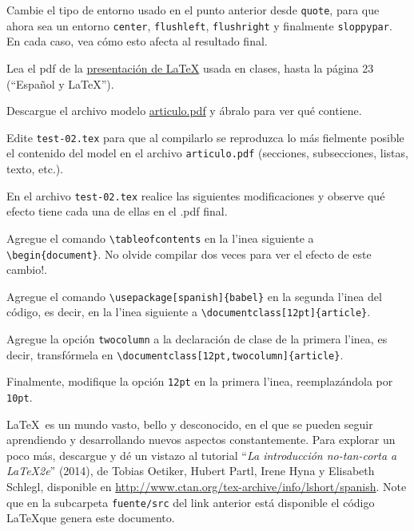\documentclass[11pt]{exam}
\begin{document}
\begin{questions}
\item Cambie el tipo de entorno usado en el punto anterior desde \texttt{quote}, para que ahora sea un entorno \texttt{center}, \texttt{flushleft}, \texttt{flushright} y finalmente \texttt{sloppypar}. En cada caso, vea cómo esto afecta al resultado final.

\item Lea el pdf de la \href{https://github.com/gfrubi/CC/blob/master/LaTeX/clases-LaTeX.pdf}{presentación de \LaTeX} usada en clases, hasta la página 23 (``Espa\~nol y \LaTeX'').

\item Descargue el archivo modelo \href{https://github.com/gfrubi/CC/blob/master/guias/03/articulo.pdf}{articulo.pdf} y ábralo para ver qué contiene. 


\item Edite \texttt{test-02.tex} para que al compilarlo se reproduzca lo más fielmente posible el contenido del model en el archivo \texttt{articulo.pdf} (secciones, subsecciones, listas, texto, etc.).

\item En el archivo \texttt{test-02.tex} realice las siguientes modificaciones y observe qué efecto tiene cada una de ellas en el .pdf final.
\begin{parts}
\item Agregue el comando \verb|\tableofcontents| en la l'inea siguiente a \verb|\begin{document}|. No olvide compilar dos veces para ver el efecto de este cambio!.
\item Agregue el comando \verb|\usepackage[spanish]{babel}| en la segunda l'inea del código, es decir, en la l'inea siguiente a \verb|\documentclass[12pt]{article}|.
\item Agregue la opción \verb|twocolumn| a la declaración de clase de la primera l'inea, es decir, transfórmela en \verb|\documentclass[12pt,twocolumn]{article}|.
\item Finalmente, modifique la opción \verb|12pt| en la primera l'inea, reemplazándola por \verb|10pt|.
\end{parts}

\item \LaTeX\ es un mundo vasto, bello y desconocido, en el que se pueden seguir aprendiendo y desarrollando nuevos aspectos constantemente. Para explorar un poco más, descargue y dé un vistazo al tutorial ``\textit{La introducción no-tan-corta a \LaTeX 2e}'' (2014), de Tobias Oetiker, Hubert Partl, Irene Hyna y Elisabeth Schlegl, disponible en \url{http://www.ctan.org/tex-archive/info/lshort/spanish}. Note que en la subcarpeta \texttt{fuente/src} del link anterior está disponible el código \LaTeX que genera este documento.


\end{questions}
\end{document}
